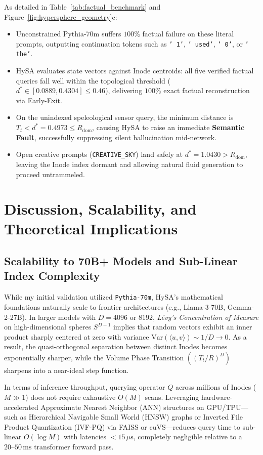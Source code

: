 \documentclass[10pt,twocolumn]{article}
\theoremstyle{definition}
\begin{document}
As detailed in Table~\ref{tab:factual_benchmark} and Figure~\ref{fig:hypersphere_geometry}c:
\begin{itemize}[leftmargin=*, itemsep=1.5pt]
    \item Unconstrained Pythia-70m suffers $100\%$ factual failure on these literal prompts, outputting continuation tokens such as \texttt{' 1'}, \texttt{' used'}, \texttt{' 0'}, or \texttt{' the'}.
    \item HySA evaluates state vectors against Inode centroids: all five verified factual queries fall well within the topological threshold ($d^* \in [0.0889, 0.4304] \le 0.46$), delivering $100\%$ exact factual reconstruction via Early-Exit.
    \item On the unindexed speleological sensor query, the minimum distance is $T_t < d^* = 0.4973 \le R_{\mathrm{dom}}$, causing HySA to raise an immediate \textbf{Semantic Fault}, successfully suppressing silent hallucination mid-network.
    \item Open creative prompts (\texttt{CREATIVE\_SKY}) land safely at $d^* = 1.0430 > R_{\mathrm{dom}}$, leaving the Inode index dormant and allowing natural fluid generation to proceed untrammeled.
\end{itemize}

\section{Discussion, Scalability, and Theoretical Implications}

\subsection{Scalability to 70B+ Models and Sub-Linear Index Complexity}
While my initial validation utilized \texttt{Pythia-70m}, HySA's mathematical foundations naturally scale to frontier architectures (e.g., Llama-3-70B, Gemma-2-27B). In larger models with $D=4096$ or $8192$, \textit{Lévy's Concentration of Measure} on high-dimensional spheres $S^{D-1}$ implies that random vectors exhibit an inner product sharply centered at zero with variance $\mathrm{Var}(\langle u, v \rangle) \sim 1/D \to 0$. As a result, the quasi-orthogonal separation between distinct Inodes becomes exponentially sharper, while the Volume Phase Transition $((T_t/R)^D)$ sharpens into a near-ideal step function.

In terms of inference throughput, querying operator $Q$ across millions of Inodes ($M \gg 1$) does not require exhaustive $O(M)$ scans. Leveraging hardware-accelerated Approximate Nearest Neighbor (ANN) structures on GPU/TPU---such as Hierarchical Navigable Small World (HNSW) graphs or Inverted File Product Quantization (IVF-PQ) via FAISS or cuVS---reduces query time to sub-linear $O(\log M)$ with latencies $<15\,\mu\text{s}$, completely negligible relative to a $20\text{--}50\,\text{ms}$ transformer forward pass.
\end{document}
